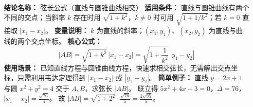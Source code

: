 \textbf{结论名称：} 弦长公式（直线与圆锥曲线相交）  
\textbf{适用条件：} 直线与圆锥曲线有两个不同的交点；当斜率 $k$ 存在时用 $\sqrt{1+k^2}$，$k\neq0$ 时可用 $\sqrt{1+1/k^2}$；若 $k=0$ 直接取 $|x_1-x_2|$。  
\textbf{变量说明：} $k$ 为直线的斜率；$(x_1,y_1)$、$(x_2,y_2)$ 为直线与曲线的两个交点坐标。  
\textbf{核心公式：}  
\[
\boxed{|AB| = \sqrt{1+k^{2}}\,|x_{1}-x_{2}| = \sqrt{1+\frac{1}{k^{2}}}\,|y_{1}-y_{2}|}
\]  
\textbf{使用场景：} 已知直线方程与圆锥曲线方程，快速求相交弦长，无需解出交点坐标，只需利用韦达定理得到 $|x_1-x_2|$ 或 $|y_1-y_2|$。  
\textbf{简单例子：} 直线 $y=2x+1$ 与圆 $x^{2}+y^{2}=4$ 交于 $A,B$，求弦长 $|AB|$。  
联立得 $5x^{2}+4x-3=0$，$\Delta=76$，$|x_1-x_2|=\frac{\sqrt{76}}{5}$。  
故 $|AB|=\sqrt{1+2^{2}}\cdot\frac{\sqrt{76}}{5}=\frac{2\sqrt{95}}{5}$。